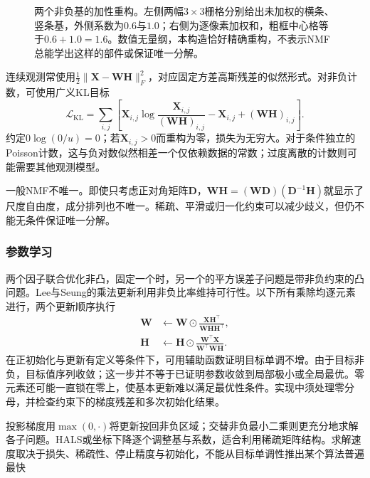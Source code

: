 \begin{figure}[htbp]
  \centering
  
  \caption{两个非负基的加性重构。左侧两幅$3\times3$栅格分别给出未加权的横条、竖条基，外侧系数为$0.6$与$1.0$；右侧为逐像素加权和，粗框中心格等于$0.6+1.0=1.6$。数值无量纲，本构造恰好精确重构，不表示NMF总能学出这样的部件或保证唯一分解。}
  \label{fig:dim-nmf-parts}
\end{figure}

连续观测常使用$\frac12\lVert\bm{X}-\bm{W}\bm{H}\rVert_F^2$，对应固定方差高斯残差的似然形式。对非负计数，可使用广义KL目标
\begin{equation}
  \mathcal{L}_{\mathrm{KL}}
  =\sum_{i,j}\left[
      \bm{X}_{i,j}\log\frac{\bm{X}_{i,j}}{(\bm{W}\bm{H})_{i,j}}
      -\bm{X}_{i,j}+(\bm{W}\bm{H})_{i,j}\right].
  \label{eq:dim-nmf-kl}
\end{equation}
约定$0\log(0/u)=0$；若$\bm{X}_{i,j}>0$而重构为零，损失为无穷大。对于条件独立的Poisson计数，这与负对数似然相差一个仅依赖数据的常数；过度离散的计数则可能需要其他观测模型。

一般NMF不唯一。即使只考虑正对角矩阵$\bm{D}$，$\bm{W}\bm{H}=(\bm{W}\bm{D})(\bm{D}^{-1}\bm{H})$就显示了尺度自由度，成分排列也不唯一。稀疏、平滑或归一化约束可以减少歧义，但仍不能无条件保证唯一分解。

\subsubsection{参数学习}
\label{sec:dim-nmf-learning}

两个因子联合优化非凸，固定一个时，另一个的平方误差子问题是带非负约束的凸问题。Lee与Seung的乘法更新利用非负比率维持可行性。以下所有乘除均逐元素进行，两个更新顺序执行
\begin{equation}
  \begin{aligned}
    \bm{W}&\leftarrow\bm{W}\odot
       \frac{\bm{X}\bm{H}^{\top}}
        {\bm{W}\bm{H}\bm{H}^{\top}},\\
    \bm{H}&\leftarrow\bm{H}\odot
       \frac{\bm{W}^{\top}\bm{X}}
        {\bm{W}^{\top}\bm{W}\bm{H}}.
  \end{aligned}
  \label{eq:dim-nmf-mu}
\end{equation}
在正初始化与更新有定义等条件下，可用辅助函数证明目标单调不增。由于目标非负，目标值序列收敛；这一步并不等于已证明参数收敛到局部极小或全局最优。零元素还可能一直锁在零上，使基本更新难以满足最优性条件。实现中须处理零分母，并检查约束下的梯度残差和多次初始化结果。

投影梯度用$\max(0,\cdot)$将更新投回非负区域；交替非负最小二乘则更充分地求解各子问题。HALS或坐标下降逐个调整基与系数，适合利用稀疏矩阵结构。求解速度取决于损失、稀疏性、停止精度与初始化，不能从目标单调性推出某个算法普遍最快

